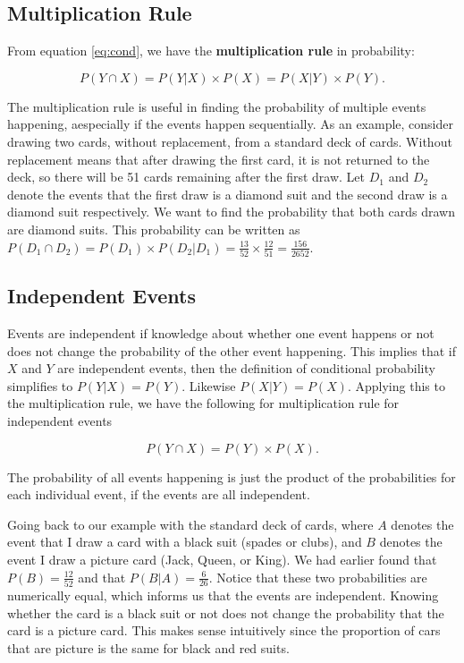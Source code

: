 \documentclass[
]{book}
\begin{document}
\subsection{Multiplication Rule}\label{multiplication-rule}

From equation \eqref{eq:cond}, we have the \textbf{multiplication rule} in probability:

\begin{equation} 
P(Y \cap X) = P(Y|X) \times P(X) = P(X|Y) \times P(Y).
\label{eq:mult}
\end{equation}

The multiplication rule is useful in finding the probability of multiple events happening, aespecially if the events happen sequentially. As an example, consider drawing two cards, without replacement, from a standard deck of cards. Without replacement means that after drawing the first card, it is not returned to the deck, so there will be 51 cards remaining after the first draw. Let \(D_1\) and \(D_2\) denote the events that the first draw is a diamond suit and the second draw is a diamond suit respectively. We want to find the probability that both cards drawn are diamond suits. This probability can be written as \(P(D_1 \cap D_2) = P(D_1) \times P(D_2|D_1)  = \frac{13}{52} \times \frac{12}{51}  = \frac{156}{2652}\).

\subsection{Independent Events}\label{independent-events}

Events are independent if knowledge about whether one event happens or not does not change the probability of the other event happening. This implies that if \(X\) and \(Y\) are independent events, then the definition of conditional probability simplifies to \(P(Y|X) = P(Y)\). Likewise \(P(X|Y) = P(X)\). Applying this to the multiplication rule, we have the following for multiplication rule for independent events

\begin{equation} 
P(Y \cap X) = P(Y) \times P(X).
\label{eq:mult2}
\end{equation}

The probability of all events happening is just the product of the probabilities for each individual event, if the events are all independent.

Going back to our example with the standard deck of cards, where \(A\) denotes the event that I draw a card with a black suit (spades or clubs), and \(B\) denotes the event I draw a picture card (Jack, Queen, or King). We had earlier found that \(P(B) = \frac{12}{52}\) and that \(P(B|A) = \frac{6}{26}\). Notice that these two probabilities are numerically equal, which informs us that the events are independent. Knowing whether the card is a black suit or not does not change the probability that the card is a picture card. This makes sense intuitively since the proportion of cars that are picture is the same for black and red suits.
\end{document}
